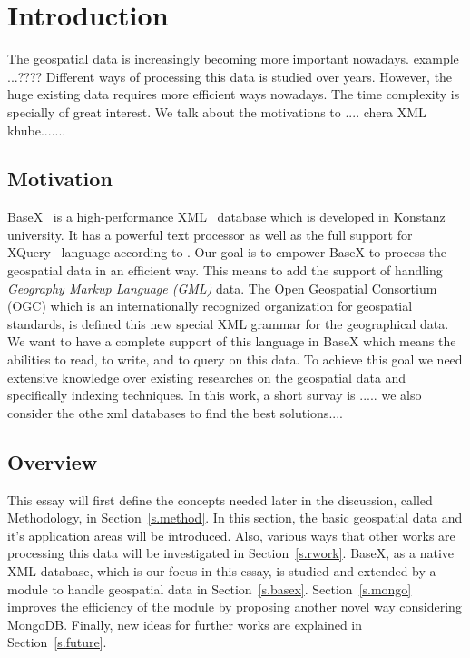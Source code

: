 \documentclass[a4paper,12pt]{article}
\begin{document}
\newpage
\tableofcontents

\thispagestyle{empty}
\newpage
\section{Introduction}
\setcounter{page}{1}
The geospatial data is increasingly becoming more important nowadays. example ...????
Different ways of processing this data is studied over years. However, the huge existing data requires more efficient ways nowadays. The time complexity is specially of great interest. We talk about the motivations to ....
chera XML khube.......

\subsection{Motivation}
BaseX~\cite{www/basex} is a high-performance XML~\cite{www/xml}
 database which is developed in Konstanz university.
It has a powerful text processor as well as the full support 
for XQuery~\cite{www/xquery,www/xqueryfun} language according to \cite{conf/xsym/GrunGHS09}.
Our goal is to empower BaseX to process the geospatial data in an efficient way. This means to add the support of handling \emph{Geography Markup Language (GML)} data. The Open Geospatial Consortium (OGC)
which is an internationally recognized organization for geospatial standards,
is defined this new special XML grammar for the geographical data.
We want to have a complete support of this language in BaseX
which means the abilities to read, to write, and to query on this data.
To achieve this goal we need extensive knowledge over existing researches on the geospatial data and specifically indexing techniques. In this work, a short survay is .....
we also consider the othe xml databases to find the best solutions....

\subsection{Overview}
This essay will first define the concepts needed later in the discussion, called
Methodology, in Section~\ref{s.method}. In this section, the basic geospatial data
and it's application areas will be introduced. Also, various ways that other works
are processing this data will be investigated in Section~\ref{s.rwork}. BaseX,
as a native XML database, which is our focus in this essay, is studied and extended
by a module to handle geospatial data in Section~\ref{s.basex}. 
Section~\ref{s.mongo} improves the efficiency of the module
by proposing another novel way considering MongoDB.
Finally, new ideas for further works are explained in
Section~\ref{s.future}.
\end{document}

